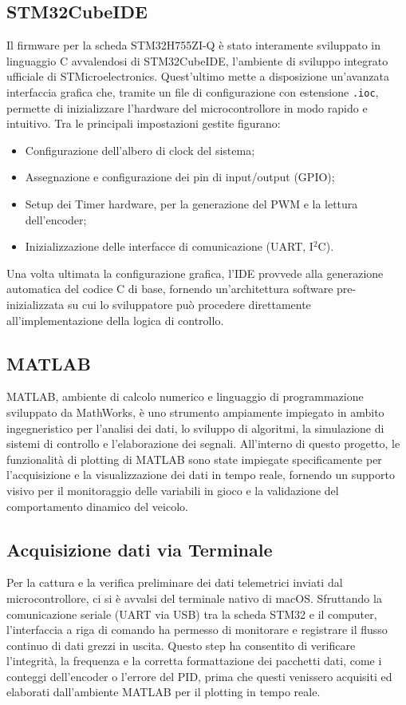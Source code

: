 \documentclass[11pt]{report}
\begin{document}
\subsection{STM32CubeIDE}
Il firmware per la scheda STM32H755ZI-Q è stato interamente sviluppato in linguaggio C avvalendosi di STM32CubeIDE, l'ambiente di sviluppo integrato ufficiale di STMicroelectronics. Quest'ultimo mette a disposizione un'avanzata interfaccia grafica che, tramite un file di configurazione con estensione \texttt{.ioc}, permette di inizializzare l'hardware del microcontrollore in modo rapido e intuitivo. Tra le principali impostazioni gestite figurano:
\begin{itemize}
    \item Configurazione dell'albero di clock del sistema;
    \item Assegnazione e configurazione dei pin di input/output (GPIO);
    \item Setup dei Timer hardware, per la generazione del PWM e la lettura dell'encoder;
    \item Inizializzazione delle interfacce di comunicazione (UART, I$^2$C).
\end{itemize}

\noindent Una volta ultimata la configurazione grafica, l'IDE provvede alla generazione automatica del codice C di base, fornendo un'architettura software pre-inizializzata su cui lo sviluppatore può procedere direttamente all'implementazione della logica di controllo.

\subsection{MATLAB}
MATLAB, ambiente di calcolo numerico e linguaggio di programmazione sviluppato da MathWorks, è uno strumento ampiamente impiegato in ambito ingegneristico per l'analisi dei dati, lo sviluppo di algoritmi, la simulazione di sistemi di controllo e l'elaborazione dei segnali. 
All'interno di questo progetto, le funzionalità di plotting di MATLAB sono state impiegate specificamente per l'acquisizione e la visualizzazione dei dati in tempo reale, fornendo un supporto visivo per il monitoraggio delle variabili in gioco e la validazione del comportamento dinamico del veicolo.

\subsection{Acquisizione dati via Terminale}
Per la cattura e la verifica preliminare dei dati telemetrici inviati dal microcontrollore, ci si è avvalsi del terminale nativo di macOS. Sfruttando la comunicazione seriale (UART via USB) tra la scheda STM32 e il computer, l'interfaccia a riga di comando ha permesso di monitorare e registrare il flusso continuo di dati grezzi in uscita. Questo step ha consentito di verificare l'integrità, la frequenza e la corretta formattazione dei pacchetti dati, come i conteggi dell'encoder o l'errore del PID, prima che questi venissero acquisiti ed elaborati dall'ambiente MATLAB per il plotting in tempo reale.
\end{document}
